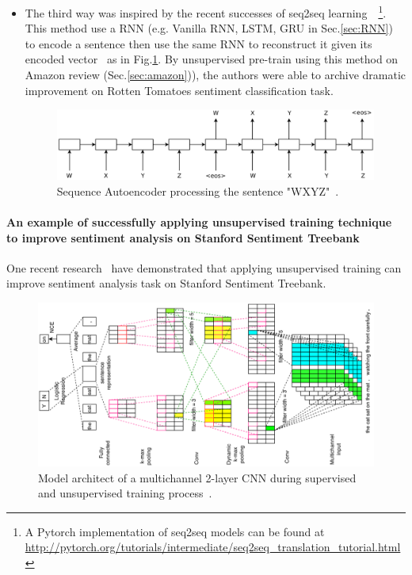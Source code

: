 \begin{itemize}
\item The third way was inspired by the recent successes of seq2seq learning~\cite{SutskeverVL14}~\cite{semisup-seq2seq}\footnote{A Pytorch implementation of seq2seq models can be found at \url{http://pytorch.org/tutorials/intermediate/seq2seq_translation_tutorial.html}}. 
This method use a RNN (e.g. Vanilla RNN, LSTM, GRU in Sec.\ref{sec:RNN}) to encode a sentence then use the same RNN to reconstruct it given its encoded vector~\cite{semisup-seq2seq} as in Fig.\ref{fig:rnn-autoencoder}.
By unsupervised pre-train using this method on Amazon review (Sec.\ref{sec:amazon})), the authors were able to archive dramatic improvement on Rotten Tomatoes sentiment classification task. 

\begin{figure}[H]
    \centering    \includegraphics[scale=0.43]{figure/rnn-autoencoder}
    \caption{Sequence Autoencoder processing the sentence "WXYZ"~\cite{semisup-seq2seq}.}
    \label{fig:rnn-autoencoder}
\end{figure}

\end{itemize}

\paragraph{An example of successfully applying unsupervised training technique to improve sentiment analysis on Stanford Sentiment Treebank} \label{sec:2-layer-cnn}
One recent research~\cite{2-layer-cnn} have demonstrated that applying unsupervised training can improve sentiment analysis task on Stanford Sentiment Treebank.

\begin{figure}
    \centering    \includegraphics[scale=0.5, angle =-90 ]{figure/2-layer-cnn}
    \caption{Model architect of a multichannel 2-layer CNN during supervised and unsupervised training process~\cite{2-layer-cnn}.}
    \label{fig:2-layer-cnn}
\end{figure}

